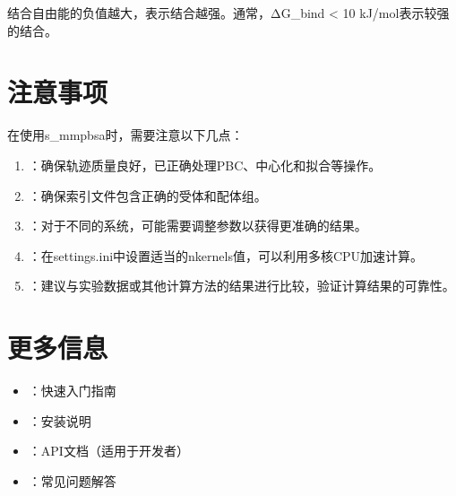 \documentclass[letterpaper,10pt,english]{sphinxmanual}
\begin{document}
\sphinxAtStartPar
结合自由能的负值越大，表示结合越强。通常，ΔG\_bind < \sphinxhyphen{}10 kJ/mol表示较强的结合。


\section{注意事项}
\label{\detokenize{usage:id12}}
\sphinxAtStartPar
在使用s\_mmpbsa时，需要注意以下几点：
\begin{enumerate}
%
\item {} 
\sphinxAtStartPar
{}：确保轨迹质量良好，已正确处理PBC、中心化和拟合等操作。

\item {} 
\sphinxAtStartPar
{}：确保索引文件包含正确的受体和配体组。

\item {} 
\sphinxAtStartPar
{}：对于不同的系统，可能需要调整参数以获得更准确的结果。

\item {} 
\sphinxAtStartPar
{}：在settings.ini中设置适当的nkernels值，可以利用多核CPU加速计算。

\item {} 
\sphinxAtStartPar
{}：建议与实验数据或其他计算方法的结果进行比较，验证计算结果的可靠性。

\end{enumerate}


\section{更多信息}
\label{\detokenize{usage:id13}}\begin{itemize}
\item {} 
\sphinxAtStartPar
{\hyperref[\detokenize{quick_start::doc}]{}}：快速入门指南

\item {} 
\sphinxAtStartPar
{\hyperref[\detokenize{installation::doc}]{}}：安装说明

\item {} 
\sphinxAtStartPar
{}：API文档（适用于开发者）

\item {} 
\sphinxAtStartPar
{\hyperref[\detokenize{faq::doc}]{}}：常见问题解答

\end{itemize}
\end{document}
